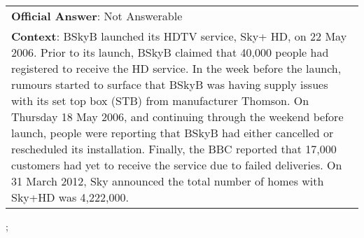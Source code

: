 \begin{figure*}[ht]
{\begin{tabular}{p{}}
            \textbf{Official Answer}: Not Answerable                                                                                                                                                                                                                                                                                                                                                                                                                                                                                                                                                                                                                                                        \\
            \textbf{Context}: BSkyB launched its HDTV service, Sky+ HD, on 22 May 2006. Prior to its launch, BSkyB claimed that 40,000 people had registered to receive the HD service. In the week before the launch, rumours started to surface that BSkyB was having supply issues with its set top box (STB) from manufacturer Thomson. On Thursday 18 May 2006, and continuing through the weekend before launch, people were reporting that BSkyB had either cancelled or rescheduled its installation. Finally, the BBC reported that 17,000 customers had yet to receive the service due to failed deliveries. On 31 March 2012, Sky announced the total number of homes with Sky+HD was 4,222,000. \\
        \end{tabular}
    };
    \label{fig:ex-5a2c30dabfd06b001a5aea2c}
\end{figure*}

